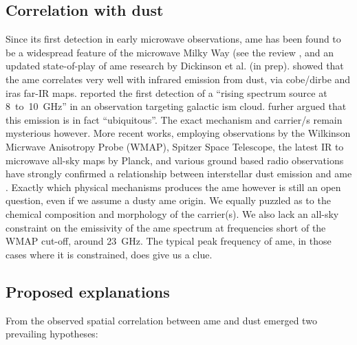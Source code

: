     \subsection{Correlation with dust}
         Since its first detection in early microwave observations, \acrshort{ame} has been found to be a widespread feature of the microwave Milky Way (see the review \cite{dickinson13r}, and an updated state-of-play of \acrshort{ame} research by Dickinson et al. (in prep). \cite{kogut96,deoliveiracosta97} showed that the \acrshort{ame} correlates very well with infrared emission from dust, via \acrshort{cobe}/\acrshort{dirbe} and \acrshort{iras} far-IR maps.  \cite{finkbeiner02} reported the first detection of a ``rising spectrum source at 8~to~10~GHz'' in an observation targeting galactic \acrshort{ism} cloud. \cite{deoliveiracosta02} furher argued that this emission is in fact ``ubiquitous''. The exact mechanism and carrier/s remain mysterious however.
        More recent works, employing observations by the Wilkinson Micrwave Anisotropy Probe (WMAP), Spitzer Space Telescope, the latest IR to microwave all-sky maps by Planck, and various ground based radio observations have strongly confirmed a relationship between interstellar dust emission and \acrshort{ame} \citep{ysard10a,tibbs11,hensley16}. Exactly which physical mechanisms produces the \acrshort{ame} however is still an open question, even if we assume a dusty \acrshort{ame} origin. We equally puzzled as to the chemical composition and morphology of the carrier(s). We also lack an all-sky constraint on the emissivity of the \acrshort{ame} spectrum at frequencies short of the WMAP cut-off, around 23~GHz. The typical peak frequency of \acrshort{ame}, in those cases where it is constrained, does give us a clue.

  \subsection{Proposed explanations}
     From the observed spatial correlation between \acrshort{ame} and dust emerged two prevailing hypotheses:


